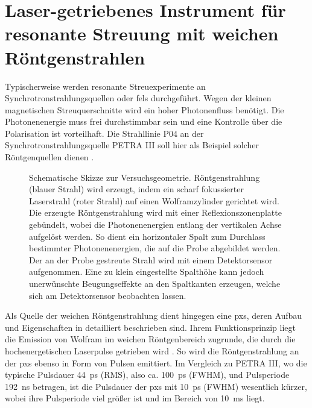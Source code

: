 \chapter{Laser-getriebenes Instrument für resonante Streuung mit weichen Röntgenstrahlen}
\label{text:quelle_roentgen}
Typischerweise werden resonante Streuexperimente an Synchrotronstrahlungsquellen oder \gls{fel}s durchgeführt. Wegen der kleinen magnetischen Streuquerschnitte wird ein hoher Photonenfluss benötigt. Die Photonenenergie muss frei durchstimmbar sein und eine Kontrolle über die Polarisation ist vorteilhaft. Die Strahllinie P04 an der Synchrotronstrahlungsquelle PETRA III soll hier als Beispiel solcher Röntgenquellen dienen \cite{viefhaus_variable_2013}.
\begin{figure}[H]
    \centering
    
    \caption{Schematische Skizze zur Versuchsgeometrie. Röntgenstrahlung (blauer Strahl) wird erzeugt, indem ein scharf fokussierter Laserstrahl (roter Strahl) auf einen Wolframzylinder gerichtet wird. Die erzeugte Röntgenstrahlung wird mit einer Reflexionszonenplatte gebündelt, wobei die Photonenenergien entlang der vertikalen Achse aufgelöst werden. So dient ein horizontaler Spalt zum Durchlass bestimmter Photonenenergien, die auf die Probe abgebildet werden. Der an der Probe gestreute Strahl wird mit einem Detektorsensor aufgenommen. Eine zu klein eingestellte Spalthöhe kann jedoch unerwünschte Beugungseffekte an den Spaltkanten erzeugen, welche sich am Detektorsensor beobachten lassen.}
    \label{fig:pxs_aufbau}
\end{figure}
\noindent
Als Quelle der weichen Röntgenstrahlung dient hingegen eine \gls{pxs}, deren Aufbau und Eigenschaften in \cite{schick_laser-driven_2021} detailliert beschrieben sind. Ihrem Funktionsprinzip liegt die Emission von Wolfram im weichen Röntgenbereich zugrunde, die durch die hochenergetischen Laserpulse getrieben wird \cite{mantouvalou_high_2015}. So wird die Röntgenstrahlung an der \gls{pxs} ebenso in Form von Pulsen emittiert. Im Vergleich zu PETRA III, wo die typische Pulsdauer \SI{44}{\pico\second} (RMS), also ca. \SI{100}{\pico\second} (FWHM), und Pulsperiode \SI{192}{\nano\second}  betragen, ist die Pulsdauer der \gls{pxs} mit \SI{10}{\pico\second} (FWHM) wesentlich kürzer, wobei ihre Pulsperiode viel größer ist und im Bereich von \SI{10}{\milli\second} liegt.
